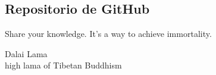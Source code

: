 \begin{appendices}
	\chapter{Repositorio de GitHub}\label{ap-01}
	\epigraph{Share your knowledge. It’s a way to achieve immortality.}{Dalai Lama\\high lama of Tibetan Buddhism}
		
\end{appendices}
\endinput